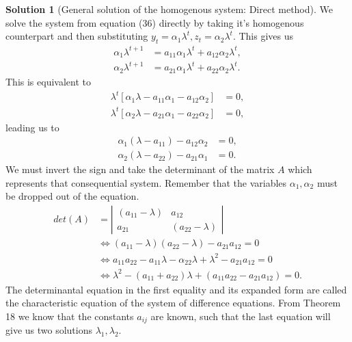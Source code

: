 \documentclass{article}
\theoremstyle{definition}
\theoremstyle{Solution}
\newtheorem{solution}{Solution}
\begin{document}
\begin{solution}[General solution of the homogenous system: Direct method]
We solve the system from equation (36) directly by taking it's homogenous counterpart and then substituting $y_t=\alpha_1\lambda^t, z_t=\alpha_2\lambda^t$. This gives us
\begin{equation}
	\begin{aligned}
		\alpha_1\lambda^{t+1}&=a_{11}\alpha_1\lambda^t+a_{12}\alpha_2\lambda^t, \\
		\alpha_2\lambda^{t+1}&=a_{21}\alpha_1\lambda^t+a_{22}\alpha_2\lambda^t.
	\end{aligned}
\end{equation}
This is equivalent to
\begin{equation}
	\begin{aligned}
		\lambda^t[\alpha_1\lambda-a_{11}\alpha_1-a_{12}\alpha_2]&=0, \\
		\lambda^t[\alpha_2\lambda-a_{21}\alpha_1-a_{22}\alpha_2]&=0,
	\end{aligned}
\end{equation}
leading us to
\begin{equation}
	\begin{aligned}
		\alpha_1(\lambda-a_{11})-a_{12}\alpha_2&=0, \\
		\alpha_2(\lambda-a_{22})-a_{21}\alpha_1&=0.
	\end{aligned}
\end{equation}
We must invert the sign and take the determinant of the matrix $A$ which represents that consequential system. Remember that the variables $\alpha_1, \alpha_2$ must be dropped out of the equation.
\begin{equation}
	\begin{aligned}
		det(A)&=\left|\begin{matrix}
			(a_{11}-\lambda) & a_{12} \\ 
			a_{21} & (a_{22}-\lambda) 
		\end{matrix} \right| \\
		&\Leftrightarrow (a_{11}-\lambda)(a_{22}-\lambda)-a_{21}a_{12}=0 \\
		&\Leftrightarrow a_{11}a_{22}-a_{11}\lambda-\alpha_{22}\lambda+\lambda^2-a_{21}a_{12}=0 \\
		&\Leftrightarrow \lambda^2-(a_{11}+a_{22})\lambda+(a_{11}a_{22}-a_{21}a_{12})=0.
	\end{aligned}
\end{equation}
The determinantal equation in the first equality and its expanded form are called the characteristic equation of the system of difference equations. From Theorem 18 we know that the constants $a_{ij}$ are known, such that the last equation will give us two solutions $\lambda_1,\lambda_2$.
\end{solution}
\end{document}
